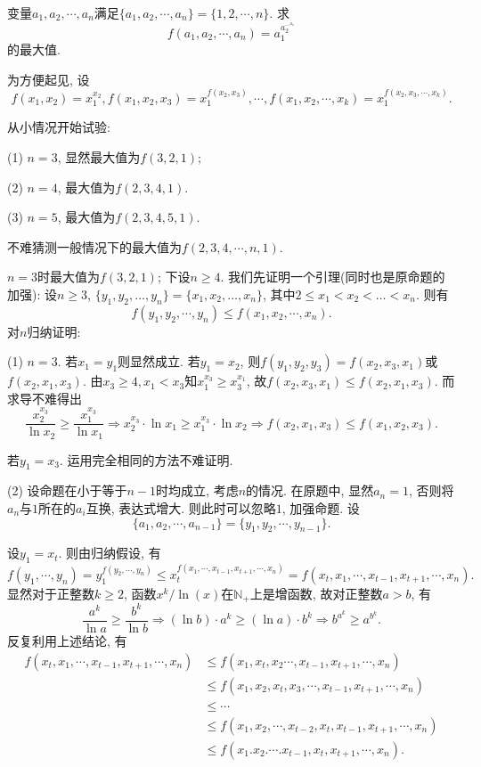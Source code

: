 \documentclass[lang=cn,12pt,thmcnt=section]{elegantbook}
\begin{document}
\begin{example}
变量$ a_{1},a_{2},\cdots,a_{n}$满足$\{a_{1},a_{2},\cdots,a_{n}\}=\{1,2,\cdots,n\}$. 求
\[f(a_1,a_2,\cdots,a_n)=a_1^{a_2^{\cdots^{a_n}}}\]
的最大值.
\end{example}

\begin{analysis}
为方便起见, 设
\[f(x_1,x_2)=x_1^{x_2},f(x_1,x_2,x_3)=x_1^{f(x_2,x_3)},\cdots,f(x_1,x_2,\cdots,x_k)=x_1^{f(x_2,x_3,\cdots,x_k)}.\]\par 
从小情况开始试验:\par 
(1) $n=3$, 显然最大值为$f(3,2,1)$;\par 
(2) $n=4$, 最大值为$f(2,3,4,1)$.\par
(3) $n=5$, 最大值为$f(2,3,4,5,1)$.\par
不难猜测一般情况下的最大值为$f(2,3,4,\cdots,n,1)$.
\end{analysis}

\begin{solution}
$n=3$时最大值为$f(3,2,1)$; 下设$n\ge 4$.
我们先证明一个引理(同时也是原命题的加强): 设$n\ge 3$, $\{y_1,y_{2},\ldots,y_{n}\}=\{x_{1},x_{2},\ldots,x_{n}\}$, 其中$2\leq x_{1}<x_{2}<\ldots<x_{n}$. 则有
\[f(y_1,y_2,\cdots,y_n)\le f(x_1,x_2,\cdots,x_n).\]
对$n$归纳证明:\par 
(1) $n=3$. 若$x_1=y_1$则显然成立. 若$y_1=x_2$, 则$f(y_1,y_2,y_3)=f(x_2,x_3,x_1)$或$f(x_2,x_1,x_3)$. 由$x_3\ge 4,x_1<x_3$知$x_1^{x_3}\ge x_3^{x_1}$, 故$f(x_2,x_3,x_1)\le f(x_2,x_1,x_3)$. 而求导不难得出
\[\frac{x_2^{x_3}}{\ln x_2}\ge\frac{x_1^{x_3}}{\ln x_1}\Rightarrow x_{2}^{x_{3}}\cdot\ln x_{1}\geq x_{1}^{x_{3}}\cdot\ln x_{2}\Rightarrow f(x_2,x_1,x_3)\le f(x_1,x_2,x_3).\]\par
若$y_1=x_3$. 运用完全相同的方法不难证明.\par
(2) 设命题在小于等于$n-1$时均成立, 考虑$n$的情况. 在原题中, 显然$a_n=1$, 否则将$a_n$与$1$所在的$a_i$互换, 表达式增大. 则此时可以忽略$1$, 加强命题. 设
\[\{a_{1},a_{2},\cdots,a_{n-1}\}=\{y_1,y_2,\cdots,y_{n-1}\}.\]\par
设$y_1=x_t$. 则由归纳假设, 有
\[f(y_1,\cdots,y_n)=y_1^{f(y_2,\cdots,y_n)}\le x_t^{f(x_1,\cdots,x_{t-1},x_{t+1},\cdots,x_n)}=f(x_t,x_1,\cdots,x_{t-1},x_{t+1},\cdots,x_n).\]
显然对于正整数$k\ge 2$, 函数$x^k/\ln(x)$在$\mathbb{N_+}$上是增函数, 故对正整数$a>b$, 有
\[\frac{a^k}{\ln a}\ge \frac{b^k}{\ln b} \Rightarrow (\ln b)\cdot a^k\ge (\ln a)\cdot b^k\Rightarrow b^{a^k}\ge a^{b^k}.\]
反复利用上述结论, 有
\begin{align*}
f(x_t,x_1,\cdots,x_{t-1},x_{t+1},\cdots,x_n)&\le f(x_1,x_t,x_2\cdots,x_{t-1},x_{t+1},\cdots,x_n)\\
&\le f(x_1,x_2,x_t,x_3,\cdots,x_{t-1},x_{t+1},\cdots,x_n)\\
&\le \cdots\\
&\le f(x_1,x_2,\cdots,x_{t-2},x_t,x_{t-1},x_{t+1},\cdots,x_n)\\
&\le f(x_1.x_2.\cdots.x_{t-1},x_{t},x_{t+1},\cdots,x_n).
\end{align*}
\end{solution}
\end{document}
